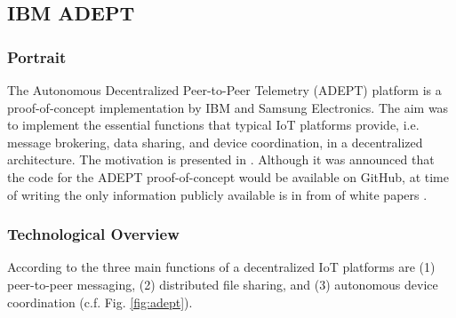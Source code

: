 




\subsection{IBM ADEPT}

\subsubsection{Portrait}
The Autonomous Decentralized Peer-to-Peer Telemetry (ADEPT) platform is a proof-of-concept implementation by IBM and Samsung Electronics. The aim was to implement the essential functions that typical IoT platforms provide, i.e. message brokering, data sharing, and device coordination, in a decentralized architecture. The motivation is presented in \cite{devicedemocracy}. 
Although it was announced that the code for the ADEPT proof-of-concept would be available on GitHub, at time of writing the only information publicly available is in from of white papers \cite{empoweringtheedge}. 

\subsubsection{Technological Overview}

According to \cite{empoweringtheedge} the three main functions of a decentralized IoT platforms are (1) peer-to-peer messaging, (2) distributed file sharing, and (3) autonomous device coordination (c.f. Fig. \ref{fig:adept}). 

